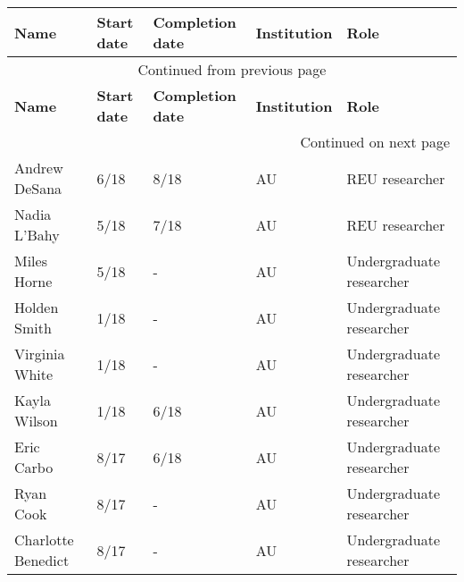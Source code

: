 {\sffamily\small
\begin{longtable}[l]{ @{} p{1.2in} p{0.5in} p{0.8in}p{0.75in} p{2in} @{} }
    \hline
    \textbf{Name} & \textbf{Start date} & \textbf{Completion date} & \textbf{Institution} & \textbf{Role} \\
    \hline
    \endfirsthead
    \multicolumn{5}{c}{{Continued from previous page}} \\
    \hline
    \textbf{Name} & \textbf{Start date} & \textbf{Completion date} & \textbf{Institution} & \textbf{Role} \\
    \hline
    \endhead
    \hline \multicolumn{5}{r}{{Continued on next page}} \\
    \endfoot
    \hline
    \endlastfoot
    Andrew DeSana & 6/18 & 8/18 & AU & REU researcher \\
    Nadia L'Bahy & 5/18 & 7/18 & AU & REU researcher \\
    Miles Horne & 5/18 & - & AU & Undergraduate researcher \\
    Holden Smith & 1/18 & - & AU & Undergraduate researcher \\
    Virginia White & 1/18 & - & AU & Undergraduate researcher \\
    Kayla Wilson & 1/18 & 6/18 & AU & Undergraduate researcher \\
    Eric Carbo & 8/17 & 6/18 & AU & Undergraduate researcher \\
    Ryan Cook & 8/17 & - & AU & Undergraduate researcher \\
    Charlotte Benedict & 8/17 & - & AU & Undergraduate researcher \\
\end{longtable}
}
